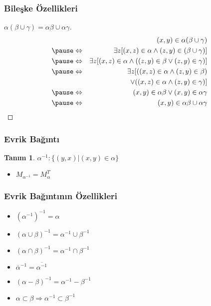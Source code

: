 \documentclass[dvipsnames]{beamer}
\theoremstyle{definition}
\newtheorem{tanim}[theorem]{Tanım}
\theoremstyle{example}
\theoremstyle{plain}
\begin{document}
\begin{frame}
  \frametitle{Bileşke Özellikleri}

  \begin{proof}[$\alpha (\beta \cup \gamma) = \alpha \beta \cup \alpha \gamma$]
    \begin{eqnarray*}
      &                 & (x,y) \in \alpha (\beta \cup \gamma)\\\pause
      & \Leftrightarrow & \exists z [(x,z) \in \alpha
                              \wedge (z,y) \in (\beta \cup \gamma)]\\\pause
      & \Leftrightarrow & \exists z [(x,z) \in \alpha
                             \wedge ((z,y) \in \beta
                                \vee (z,y) \in \gamma)]\\\pause
      & \Leftrightarrow & \exists z [((x,z) \in \alpha \wedge (z,y) \in \beta)\\
      &                 &     ~~\vee ((x,z) \in \alpha \wedge (z,y) \in \gamma)]\\\pause
      & \Leftrightarrow & (x,y) \in \alpha \beta \vee (x,y) \in \alpha \gamma\\\pause
      & \Leftrightarrow & (x,y) \in \alpha \beta \cup \alpha \gamma
    \end{eqnarray*}
  \end{proof}
\end{frame}

\begin{frame}
  \frametitle{Evrik Bağıntı}

  \begin{tanim}
    $\alpha^{-1}: \{(y,x) | (x,y) \in \alpha \}$
  \end{tanim}

  \pause
  \begin{itemize}
    \item $M_{\alpha^{-1}} = M_{\alpha}^T$
  \end{itemize}
\end{frame}

\begin{frame}
  \frametitle{Evrik Bağıntının Özellikleri}

  \begin{itemize}
    \item $(\alpha^{-1})^{-1} = \alpha$

    \pause
    \item $(\alpha \cup \beta)^{-1} = \alpha^{-1} \cup \beta^{-1}$

    \pause
    \item $(\alpha \cap \beta)^{-1} = \alpha^{-1} \cap \beta^{-1}$

    \pause
    \item $\overline{\alpha}^{-1} = \overline{\alpha^{-1}}$

    \pause
    \item $(\alpha - \beta)^{-1} = \alpha^{-1} - \beta^{-1}$

    \pause
    \item $\alpha \subset \beta \Rightarrow \alpha^{-1} \subset \beta^{-1}$
  \end{itemize}
\end{frame}
\end{document}
